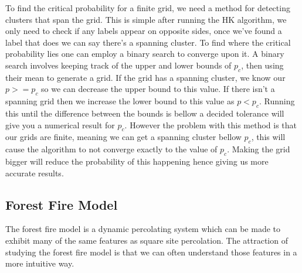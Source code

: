 \documentclass[%
 reprint,
 amsmath,amssymb,
 aps,
]{revtex4-2}
\begin{document}
To find the critical probability for a finite grid, we need a method for detecting clusters that span the grid. This is simple after running the HK algorithm, we only need to check if any labels appear on opposite sides, once we've found a label that does we can say there's a spanning cluster. To find where the critical probability lies one can employ a binary search to converge upon it. A binary search involves keeping track of the upper and lower bounds of $p_{c}$, then using their mean to generate a grid. If the grid has a spanning cluster, we know our $p >= p_{c}$ so we can decrease the upper bound to this value. If there isn't a spanning grid then we increase the lower bound to this value as $p < p_{c}$. Running this until the difference between the bounds is bellow a decided tolerance will give you a numerical result for $p_{c}$. However the problem with this method is that our grids are finite, meaning we can get a spanning cluster bellow $p_{c}$, this will cause the algorithm to not converge exactly to the value of $p_{c}$. Making the grid bigger will reduce the probability of this happening hence giving us more accurate results.


\subsection{Forest Fire Model}\label{sec:ff}
The forest fire model is a dynamic percolating system which can be made to exhibit many of the same features as square site percolation\cite{stauffer_introduction_2003}. The attraction of studying the forest fire model is that we can often understand those features in a more intuitive way. 
\end{document}
